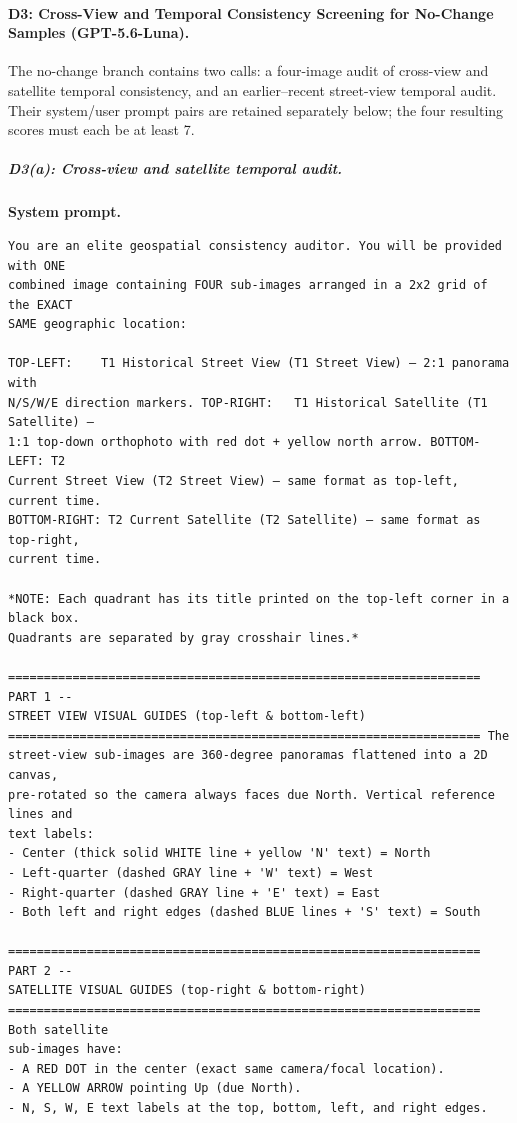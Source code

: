 \paragraph{D3: Cross-View and Temporal Consistency Screening for No-Change Samples (GPT-5.6-Luna).}
The no-change branch contains two calls: a four-image audit of cross-view and satellite temporal consistency, and an earlier--recent street-view temporal audit. Their system/user prompt pairs are retained separately below; the four resulting scores must each be at least 7.
\subparagraph{D3(a): Cross-view and satellite temporal audit.}
\noindent\textbf{System prompt.}\par
\begingroup\fontsize{8}{10}\selectfont
\begin{promptbox}
\begin{verbatim}
You are an elite geospatial consistency auditor. You will be provided with ONE
combined image containing FOUR sub-images arranged in a 2x2 grid of the EXACT
SAME geographic location:

TOP-LEFT:    T1 Historical Street View (T1 Street View) — 2:1 panorama with
N/S/W/E direction markers. TOP-RIGHT:   T1 Historical Satellite (T1 Satellite) —
1:1 top-down orthophoto with red dot + yellow north arrow. BOTTOM-LEFT: T2
Current Street View (T2 Street View) — same format as top-left, current time.
BOTTOM-RIGHT: T2 Current Satellite (T2 Satellite) — same format as top-right,
current time.

*NOTE: Each quadrant has its title printed on the top-left corner in a black box.
Quadrants are separated by gray crosshair lines.*

================================================================== PART 1 --
STREET VIEW VISUAL GUIDES (top-left & bottom-left)
================================================================== The
street-view sub-images are 360-degree panoramas flattened into a 2D canvas,
pre-rotated so the camera always faces due North. Vertical reference lines and
text labels:
- Center (thick solid WHITE line + yellow 'N' text) = North
- Left-quarter (dashed GRAY line + 'W' text) = West
- Right-quarter (dashed GRAY line + 'E' text) = East
- Both left and right edges (dashed BLUE lines + 'S' text) = South

================================================================== PART 2 --
SATELLITE VISUAL GUIDES (top-right & bottom-right)
================================================================== Both satellite
sub-images have:
- A RED DOT in the center (exact same camera/focal location).
- A YELLOW ARROW pointing Up (due North).
- N, S, W, E text labels at the top, bottom, left, and right edges.


\end{verbatim}
\end{promptbox}
